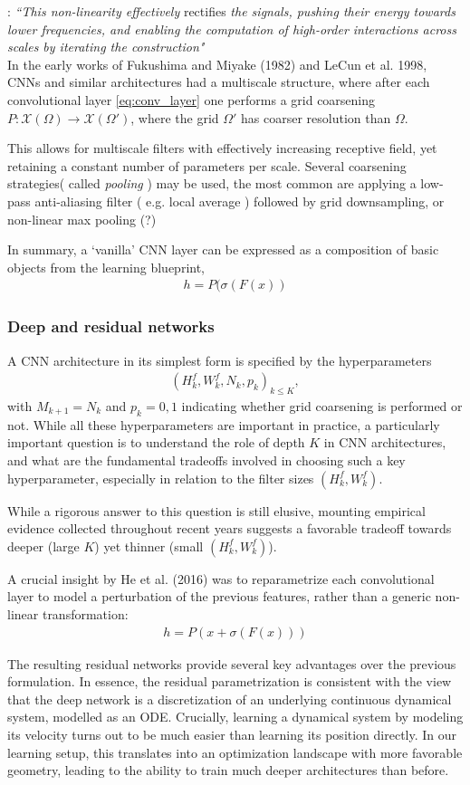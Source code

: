 \documentclass[12pt]{article}
\numberwithin{equation}{section}
\theoremstyle{definition}
\newcommand{		\cX		}	{	\mathcal{X}				}
\newcommand{		\eq		}[1]	{	\begin{align*}#1\end{align*}	}%
\newcommand{		\Oh		}	{	\Omega					}
\newcommand{		\1		}	{	\bm{1}					}%
\begin{document}
\subitem \cite{BBCV21} : \emph{``This non-linearity effectively} rectifies \emph{the signals, pushing their energy towards lower frequencies, and enabling the computation of high-order interactions across scales by iterating the construction"}\\

In the early works of Fukushima and Miyake (1982) and LeCun et al. 1998, CNNs and similar architectures had a multiscale structure, where after each convolutional layer \eqref{eq:conv_layer} one performs a grid coarsening $P : \cX( \Oh) \to \cX (\Oh')$, where the grid $\Oh'$ has coarser resolution than $\Oh$. 

This allows for multiscale filters with effectively increasing receptive field, yet retaining a constant number of parameters per scale. Several coarsening strategies( called  \emph{pooling} ) may be used, the most common are applying a low-pass anti-aliasing filter ( e.g. local average ) followed by grid downsampling, or non-linear max pooling (?) 

In summary, a `vanilla' CNN layer can be expressed as a composition of basic objects from the learning blueprint, 
\eq{
h = P( \sigma (F (x))
}

\subsubsection*{Deep and residual networks} 

A CNN architecture in its simplest form is specified by the hyperparameters
\eq{
(H_k^f, W_k^f, N_k, p_k )_{ k \leq K},
}
with $M_{k+1} = N_k$ and $p_k = 0,1$ indicating whether grid coarsening is performed or not. While all these hyperparameters are important in practice, a particularly important question is to understand the role of depth $K$ in CNN architectures, and what are the fundamental tradeoffs involved in choosing such a key hyperparameter, especially in relation to the filter sizes $(H_k^f, W_k^f)$. 

While a rigorous answer to this question is still elusive, mounting empirical evidence collected throughout recent years suggests a favorable tradeoff towards deeper (large $K$) yet thinner (small $(H_k^f, W_k^f)$).

A crucial insight by He et al. (2016) was to reparametrize each convolutional layer to model a perturbation of the previous features, rather than a generic non-linear transformation:
\eq{
h = P( x + \sigma (F(x)) )
}

The resulting residual networks provide several key advantages over the previous formulation. In essence, the residual parametrization is consistent with the view that the deep network is a discretization of an underlying continuous dynamical system, modelled as an ODE. Crucially, learning a dynamical system by modeling its velocity turns out to be much easier than learning its position directly. In our learning setup, this translates into an optimization landscape with more favorable geometry, leading to the ability to train much deeper architectures than before.
\end{document}
